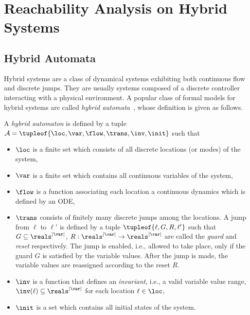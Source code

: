 \section{Reachability Analysis on Hybrid Systems}

\subsection{Hybrid Automata}

Hybrid systems are a class of dynamical systems exhibiting both continuous flow and discrete jumps. They are usually systems composed of a discrete controller interacting with a physical environment. A popular class of formal models for hybrid systems are called \emph{hybrid automata}~\cite{}, whose definition is given as follows.

\begin{defn}
 A \emph{hybrid automaton} is defined by a tuple $\mathcal{A} = \tupleof{\loc, \var, \flow, \trans, \inv, \init}$ such that
 \begin{itemize}[-]
  \item $\loc$ is a finite set which consists of all discrete locations (or modes) of the system,
  
  \item $\var$ is a finite set which contains all continuous variables of the system,
  
  \item $\flow$ is a function associating each location a continuous dynamics which is defined by an ODE,
  
  \item $\trans$ consists of finitely many discrete jumps among the locations. A jump from $\ell$ to $\ell'$ is defined by a tuple $\tupleof{\ell, G, R, \ell'}$ such that $G\subseteq \reals^{|\var|}$, $R: \reals^{|\var|}\rightarrow \reals^{|\var|}$ are called the \emph{guard} and \emph{reset} respectively. The jump is enabled, i.e., allowed to take place, only if the guard $G$ is satisfied by the variable values. After the jump is made, the variable values are reassigned according to the reset $R$.
  
  \item $\inv$ is a function that defines an \emph{invariant}, i.e., a valid variable value range, $\inv(\ell) \subseteq \reals^{|\var|}$ for each location $\ell \in \loc$,
  
  \item $\init$ is a set which contains all initial states of the system.
 \end{itemize}
\end{defn}


